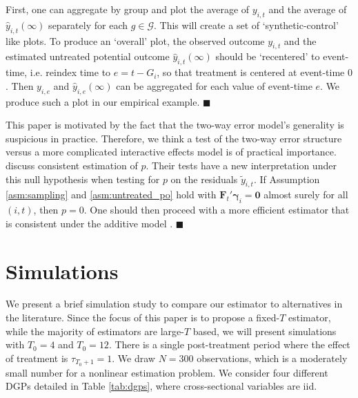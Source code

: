 \documentclass[12pt]{article}
\begin{document}
\begin{remark}
First, one can aggregate by group and plot the average of $y_{i,t}$ and the average of $\hat{y}_{i,t}(\infty)$ separately for each $g \in \mathcal{G}$. This will create a set of `synthetic-control' like plots. To produce an `overall' plot, the observed outcome $y_{i,t}$ and the estimated untreated potential outcome $\hat{y}_{i,t}(\infty)$ should be `recentered' to event-time, i.e. reindex time to $e = t - G_i$, so that treatment is centered at event-time $0$. Then $y_{i,e}$ and $\hat{y}_{i,e}(\infty)$ can be aggregated for each value of event-time $e$. We produce such a plot in our empirical example. $\blacksquare$

\end{remark}

\begin{remark}\label{remark:twfe_testing}
  This paper is motivated by the fact that the two-way error model's generality is suspicious in practice. Therefore, we think a test of the two-way error structure versus a more complicated interactive effects model is of practical importance. \citet{Ahn_Lee_Schmidt_2013} discuss consistent estimation of $p$. Their tests have a new interpretation under this null hypothesis when testing for $p$ on the residuals $\tilde{y}_{i,t}$. If Assumption \ref{asm:sampling} and \ref{asm:untreated_po} hold with $\bm{F}_t' \bm \gamma_i = \bm 0$ almost surely for all $(i,t)$, then $p = 0$. One should then proceed with a more efficient estimator that is consistent under the additive model \citep{Gardner_2021,Wooldridge_2021,Borusyak_Jaravel_Spiess_2021}. $\blacksquare$
\end{remark}






\section{Simulations}\label{sec:simulations}

We present a brief simulation study to compare our estimator to alternatives in the literature. Since the focus of this paper is to propose a fixed-$T$ estimator, while the majority of estimators are large-$T$ based, we will present simulations with $T_0 = 4$ and $T_0 = 12$. There is a single post-treatment period where the effect of treatment is $\tau_{T_0 + 1} = 1$. We draw $N = 300$ observations, which is a moderately small number for a nonlinear estimation problem. We consider four different DGPs detailed in Table \ref{tab:dgps}, where cross-sectional variables are iid.
\end{document}
